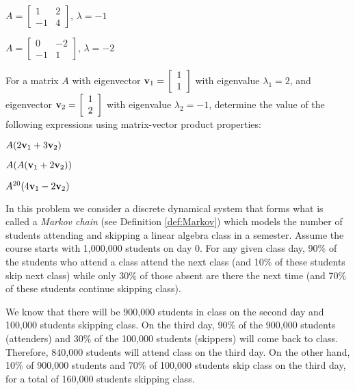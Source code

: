 \begin{minipage}{2.0in} 
\item $A=\left[ \begin{array}{rc} 1&2 \\ -1&4 \end{array} \right]$, $\lambda=-1$
\end{minipage}
\begin{minipage}{2.0in} 
\item $A=\left[ \begin{array}{rr} 0&-2 \\ -1&1 \end{array} \right]$, $\lambda=-2$
\end{minipage}
\ea

\item For a matrix $A$ with eigenvector $\mathbf{v}_1=\left[ \begin{array}{c} 1\\1 \end{array}\right]$ with eigenvalue $\lambda_1=2$, and eigenvector $\mathbf{v}_2=\left[ \begin{array}{c} 1\\2 \end{array}\right]$ with eigenvalue $\lambda_2=-1$, determine the value of the following expressions using matrix-vector product properties:
\ba
\item $A(2\mathbf{v}_1+3\mathbf{v}_2)$

\item $A(A(\mathbf{v}_1+2\mathbf{v}_2))$

\item $A^{20} (4\mathbf{v}_1-2\mathbf{v}_2)$
\ea

\item \label{ex:2_b_Markov} In this problem we consider a discrete dynamical system that forms what is called a \emph{Markov chain} (see Definition \ref{def:Markov}) which models the number of students attending and skipping a linear algebra class in a semester. Assume the course starts with 1,000,000 students on day 0. For any given class day, 90\% of the students who attend a class attend the next class (and 10\% of these students skip next class) while only 30\% of those absent are there the next time (and 70\% of these students continue skipping class). 

\ba 
\item We know that there will be 900,000 students in class on the second day and 100,000 students skipping class. On the third day, 90\% of the 900,000 students (attenders) and 30\% of the 100,000 students (skippers) will come back to class. Therefore, 840,000 students will attend class on the third day. On the other hand, 10\% of 900,000 students and 70\% of 100,000 students skip class on the third day, for a total of 160,000 students skipping class.

